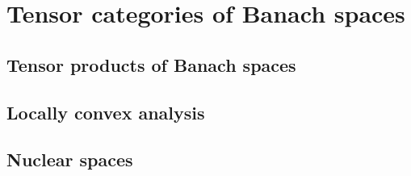 \section{Tensor categories of Banach spaces}
    \subsection{Tensor products of Banach spaces}

    \subsection{Locally convex analysis}

    \subsection{Nuclear spaces}